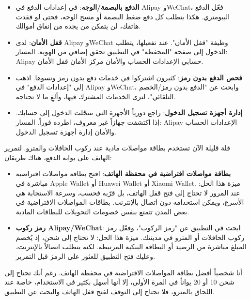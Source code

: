 
\begin{itemize}
  \item \textbf{الدفع بالبصمة/الوجه}: في إعدادات الدفع في Alipay وWeChat، فعّل الدفع البيومتري. هكذا يتطلب كل دفع ضغط البصمة أو مسح الوجه، فحتى لو فقدت هاتفك، لن يتمكن من يجده من إنفاق أموالك.
  \item \textbf{قفل الأمان}: لدى Alipay وWeChat وظيفة "قفل الأمان". عند تفعيلها، يتطلب الدخول إلى صفحة "المحفظة" في التطبيق تحقق إضافي من الهوية. المسار: Alipay حسابي الإعدادات الحساب والأمان مركز الأمان قفل الأمان.
  \item \textbf{فحص الدفع بدون رمز}: كثيرون اشتركوا في خدمات دفع بدون رمز ونسوها. اذهب إلى "إعدادات الدفع" في Alipay وWeChat، وابحث عن "الدفع بدون رمز/الخصم التلقائي"، لترى الخدمات المشترك فيها، وألغِ ما لا تحتاجه.
  \item \textbf{إدارة أجهزة تسجيل الدخول}: راجع دورياً الأجهزة التي سجّلت الدخول إلى حسابك. إذا اكتشفت جهازاً غير معروف، اطرده فوراً. المسار: Alipay الإعدادات الحساب والأمان إدارة أجهزة تسجيل الدخول.
\end{itemize}


قلة قليلة الآن تستخدم بطاقة مواصلات مادية عند ركوب الحافلات والمترو. لتمرير الهاتف على بوابة الدفع، هناك طريقان:

\begin{itemize}
  \item \textbf{بطاقة مواصلات افتراضية في محفظة الهاتف}: افتح بطاقة مواصلات افتراضية مباشرة في Apple Wallet أو Huawei Wallet أو Xiaomi Wallet. ميزة هذا الحل: عند المرور لا تحتاج إلى فتح قفل الهاتف، بل قرّبه فحسب، وسرعة الاستجابة هي الأسرع، ويمكن استخدامه دون اتصال بالإنترنت. بطاقات المواصلات الافتراضية في بعض المدن تتمتع بنفس خصومات التحويلات للبطاقات المادية.
  \item \textbf{رمز ركوب Alipay/WeChat}: ابحث في التطبيق عن "رمز الركوب"، وفعّل رمز ركوب الحافلات أو المترو في مدينتك. ميزة هذا الحل: لا تحتاج إلى شحن، إذ يُخصم المبلغ مباشرة من الرصيد أو البطاقة البنكية المرتبطة. لكنه يتطلب اتصالاً بالإنترنت، وعليك فتح التطبيق للعثور على الرمز قبل التمرير.
\end{itemize}

أنا شخصياً أفضل بطاقة المواصلات الافتراضية في محفظة الهاتف. رغم أنك تحتاج إلى شحن 10 أو 20 يواناً في المرة الأولى، إلا أنها أسهل بكثير في الاستخدام، خاصة عند اللحاق بالمترو، فلا تحتاج إلى التوقف لفتح قفل الهاتف والبحث عن التطبيق.

